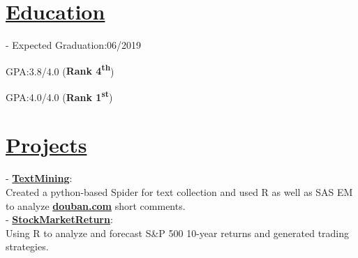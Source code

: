 \documentclass[a4paper, bookmarks=false,hidelinks]{resume} %
\begin{document}
\begin{minipage}[t]{0.27\textwidth} %


\section{\underline{Education}} 

- Expected Graduation:06/2019\\



\sectionspace %

GPA:3.8/4.0 ({\bf Rank 4\textsuperscript{th}})

\sectionspace %


GPA:4.0/4.0 ({\bf Rank 1\textsuperscript{st}})

\sectionspace %


\section{\underline{Projects}}
 - \href{https://github.com/ShowerLin/DoubanSpider-ShortComment}{\textbf{TextMining}}: \\
Created a python-based Spider for text collection and used R as well as SAS EM to analyze \href{https://movie.douban.com}{\textbf{douban.com}} short comments.\\
\sectionspace %
 - \href{https://github.com/ShowerLin/DMwR-Stock-Market-Return}{\textbf{StockMarketReturn}}:\\
Using R to analyze and forecast S\&P 500 10-year returns and generated trading strategies. 
\sectionspace %




\end{minipage}
\end{document}
